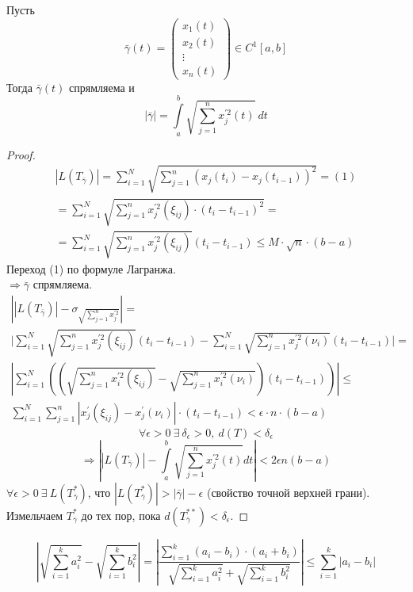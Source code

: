 \begin{theorem}
    Пусть 
    \[\bar{\gamma}(t) = 
    \begin{pmatrix}
    x_1(t)\\
    x_2(t)\\
    \vdots\\
    x_n(t)
    \end{pmatrix} \in C^1[a,b]\]
    Тогда $\bar{\gamma}(t)$ спрямляема и
    \[|\bar{\gamma}| = \int\limits_{a}^{b} \sqrt{\sum_{j = 1}^{n} x_j^{'2}(t)}\ dt\]
\end{theorem}
\begin{proof}
    \begin{multline*}
        |L(T_{\bar{\gamma}})| = \sum_{i = 1}^{N} \sqrt{ \sum_{j = 1}^{n}(x_j(t_i) - x_j(t_{i - 1}))^2} = (1)\\
        = \sum_{i = 1}^{N} \sqrt{\sum_{j = 1}^{n} x_j^{'2}(\xi_{ij}) \cdot (t_i - t_{i - 1})^2} =\\
        = \sum_{i = 1}^{N} \sqrt{\sum_{j = 1}^{n} x_j^{'2} (\xi_{ij})} (t_i - t_{i - 1}) \leqslant M \cdot \sqrt{n} \cdot (b - a)
    \end{multline*}
    Переход (1) по формуле Лагранжа.\\
    $\Rightarrow \bar{\gamma}$ спрямляема.
    \begin{multline*}
        \left| |L(T_{\bar{\gamma}})| - \sigma_{\sqrt{\sum_{j = 1}^{n} x_j^{'2}}} \right| =\\
        \Bigg| \sum_{i = 1}^{N} \sqrt{\sum_{j = 1}^{n} x_j^{'2} (\xi_{ij})}(t_i - t_{i - 1}) - \sum_{i = 1}^{N} \sqrt{\sum_{j = 1}^{n} x_j^{'2} (\nu_{i})}(t_i - t_{i - 1}) \Bigg| =\\ 
        \left| \sum_{i=1}^{N} \left( \left( \sqrt{\sum_{j = 1}^{n} x_i^{'2} (\xi_{ij})} - \sqrt{\sum_{j = 1}^{n} x_i^{'2} (\nu_{i})}  \right) (t_i - t_{i - 1}) \right) \right| \leqslant\\
        \sum_{i = 1}^{N} \sum_{j = 1}^{n} |x_j^{'} (\xi_{ij}) - x_j^{'} (\nu_i)| \cdot (t_i - t_{i - 1}) < \epsilon \cdot n \cdot (b - a)
    \end{multline*}
    \[\forall \epsilon > 0 \ \exists\ \delta_{\epsilon} > 0,\ d(T) < \delta_{\epsilon}\]
    \[\Rightarrow \left| |L(T_{\bar{\gamma}})| - \int\limits_{a}^{b} \sqrt{\sum_{j = 1}^{n} x_{j}^{'2}(t)} dt \right| < 2 \epsilon n (b-a)\]
    $\forall \epsilon > 0 \ \exists\ L(T^{*}_{\bar{\gamma}})$, что $|L(T^{*}_{\bar{\gamma}}) | > |\bar{\gamma}| - \epsilon$ (свойство точной верхней грани). \newline
    Измельчаем $T_{\bar{\gamma}}^{*}$ до тех пор, пока $d(T_{\bar{\gamma}}^{**}) < \delta_{\epsilon}$.
\end{proof}

\begin{statement}
        \[\left|
            \sqrt{\sum_{i = 1}^{k} a_i^2} - \sqrt{\sum_{i = 1}^{k} b_i^2}
        \right| = 
        \left|
            \frac{\sum_{i = 1}^{k} (a_i - b_i) \cdot (a_i + b_i)}{\sqrt{\sum_{i = 1}^{k} a_i^2} + \sqrt{\sum_{i = 1}^{k} b_i^2}}
        \right| \leqslant \sum_{i = 1}^{k} |a_i - b_i|\]
\end{statement}


